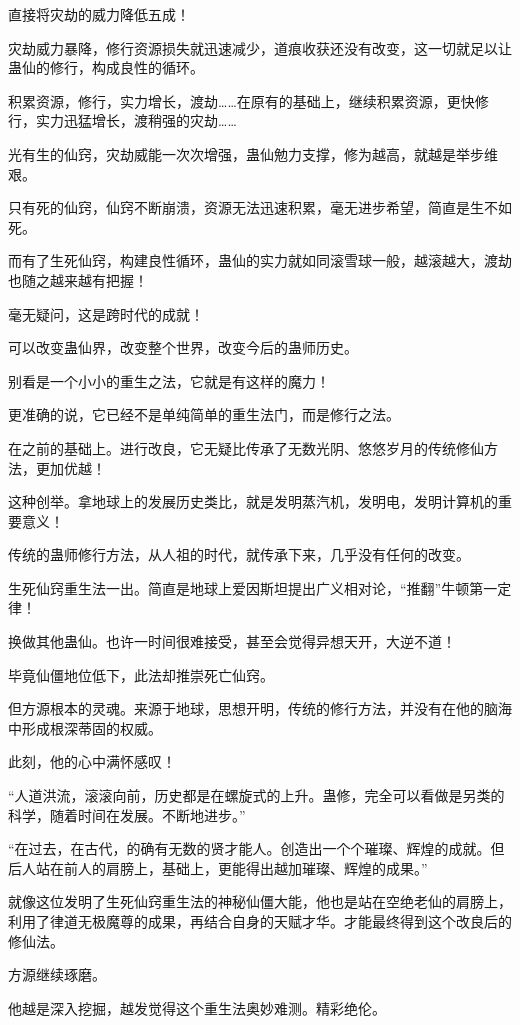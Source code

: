 \begin{this_body}
直接将灾劫的威力降低五成！

灾劫威力暴降，修行资源损失就迅速减少，道痕收获还没有改变，这一切就足以让蛊仙的修行，构成良性的循环。

积累资源，修行，实力增长，渡劫……在原有的基础上，继续积累资源，更快修行，实力迅猛增长，渡稍强的灾劫……

光有生的仙窍，灾劫威能一次次增强，蛊仙勉力支撑，修为越高，就越是举步维艰。

只有死的仙窍，仙窍不断崩溃，资源无法迅速积累，毫无进步希望，简直是生不如死。

而有了生死仙窍，构建良性循环，蛊仙的实力就如同滚雪球一般，越滚越大，渡劫也随之越来越有把握！

毫无疑问，这是跨时代的成就！

可以改变蛊仙界，改变整个世界，改变今后的蛊师历史。

别看是一个小小的重生之法，它就是有这样的魔力！

更准确的说，它已经不是单纯简单的重生法门，而是修行之法。

在之前的基础上。进行改良，它无疑比传承了无数光阴、悠悠岁月的传统修仙方法，更加优越！

这种创举。拿地球上的发展历史类比，就是发明蒸汽机，发明电，发明计算机的重要意义！

传统的蛊师修行方法，从人祖的时代，就传承下来，几乎没有任何的改变。

生死仙窍重生法一出。简直是地球上爱因斯坦提出广义相对论，“推翻”牛顿第一定律！

换做其他蛊仙。也许一时间很难接受，甚至会觉得异想天开，大逆不道！

毕竟仙僵地位低下，此法却推崇死亡仙窍。

但方源根本的灵魂。来源于地球，思想开明，传统的修行方法，并没有在他的脑海中形成根深蒂固的权威。

此刻，他的心中满怀感叹！

“人道洪流，滚滚向前，历史都是在螺旋式的上升。蛊修，完全可以看做是另类的科学，随着时间在发展。不断地进步。”

“在过去，在古代，的确有无数的贤才能人。创造出一个个璀璨、辉煌的成就。但后人站在前人的肩膀上，基础上，更能得出越加璀璨、辉煌的成果。”

就像这位发明了生死仙窍重生法的神秘仙僵大能，他也是站在空绝老仙的肩膀上，利用了律道无极魔尊的成果，再结合自身的天赋才华。才能最终得到这个改良后的修仙法。

方源继续琢磨。

他越是深入挖掘，越发觉得这个重生法奥妙难测。精彩绝伦。


\end{this_body}
